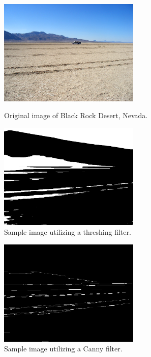 \documentclass[10pt,letterpaper,onecolumn,draftclsnofoot,journal]{IEEEtran}
\begin{document}
\begin{figure}[h]
	\captionsetup{justification=raggedright, singlelinecheck=off}
    	\includegraphics[width=0.6\textwidth]{blackrock}
    	\caption{Original image of Black Rock Desert, Nevada.}
	\vspace{1.5cm}

	\centering
	\captionsetup{justification=raggedleft, margin=3.6cm,singlelinecheck=off}
	\hfill
    	\includegraphics[width=0.6\textwidth]{thresh}
    	\caption{Sample image utilizing a threshing filter.}

\end{figure}
\newpage
\begin{figure}
	\captionsetup{justification=raggedright, singlelinecheck=off}
    	\includegraphics[width=0.6\textwidth]{canny}
    	\caption{Sample image utilizing a Canny filter.}

\end{figure}
\end{document}
